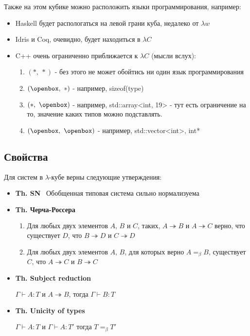 \documentclass[12pt]{article}
\begin{document}
Также на этом кубике можно расположить языки программирования, например:
\begin{itemize}
    \item Haskell будет распологаться на левой грани куба, недалеко от $\lambda w$
    \item Idris и Coq, очевидно, будет находиться в $\lambda C$
    \item C++ очень ограниченно приближается к $\lambda C$ (мысли вслух):
    \begin{enumerate}
        \item $(*,\ *)$ - без этого не может обойтись ни один язык программирования
        \item $(\openbox,\ *)$ - например, sizeof(type)
        \item $(*,\ \openbox)$ - например, std::array<int, 19> - тут есть ограничение на то, значение каких типов можно подставлять.
        \item $(\openbox,\ \openbox)$ - например, std::vector<int>, int*
    \end{enumerate}
\end{itemize}

\subsection{Свойства}

Для систем в $\lambda$-кубе верны следующие утверждения:
\begin{itemize}
    \item \textbf{Th. SN} \qquad \qquad \qquad \quad \quad \ Обобщенная типовая система сильно нормализуема
    \item \textbf{Th. Черча-Россера} \quad \begin{minipage}{0.6\textwidth}
\raggedright %
\begin{enumerate}
    \item Для любых двух элементов $A$, $B$ и $C$, таких, 
    $A \twoheadrightarrow B$ и $A \twoheadrightarrow C$ верно,
    что существует $D$, что 
    $B \twoheadrightarrow D$ и $C \twoheadrightarrow D$
    \item Для любых двух элементов $A$, $B$, для которых верно $A =_\beta B$, 
    существует $C$, что $A \twoheadrightarrow C$ и $B \twoheadrightarrow C$
\end{enumerate}
\end{minipage}
    \item \textbf{Th. Subject reduction} \quad \begin{minipage}{0.6\textwidth}
\raggedright %
    $\Gamma \vdash A : T$ и $A \twoheadrightarrow B$, тогда $\Gamma \vdash B : T$ 
\end{minipage}
    \item \textbf{Th. Unicity of types} \quad \ \  \begin{minipage}{0.6\textwidth}
\raggedright %
    $\Gamma \vdash A : T$ и $\Gamma \vdash A : T'$ тогда $T =_\beta T'$ 
\end{minipage}
\end{itemize}
\end{document}
